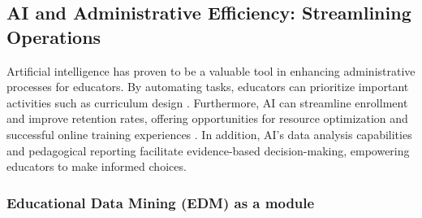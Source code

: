 

\subsection{AI and Administrative Efficiency: Streamlining Operations}
Artificial intelligence has proven to be a valuable tool in enhancing administrative processes for educators. 
By automating tasks, educators can prioritize important activities such as curriculum design \citep{drach_use_2023}.
Furthermore, AI can streamline enrollment and improve retention rates, offering opportunities for resource optimization 
and successful online training experiences \citep{lukianets_promises_2023}. In addition, AI's data analysis capabilities 
and pedagogical reporting facilitate evidence-based decision-making, empowering educators to make informed choices\citep{guerrero-quinonez_artificial_2023}.

\subsubsection{Educational Data Mining (EDM) as a module}

